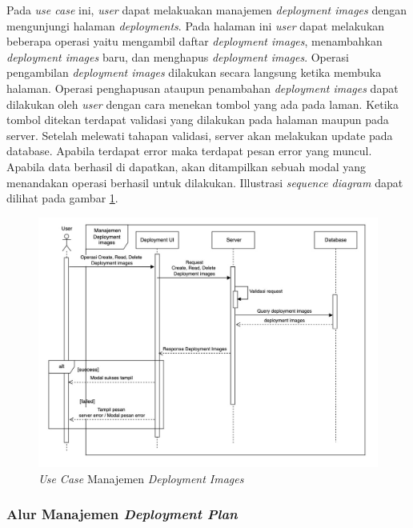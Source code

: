 Pada \textit{use case} ini, \textit{user} dapat melakuakan manajemen \textit{deployment images} dengan mengunjungi halaman \textit{deployments}. Pada halaman ini \textit{user} dapat melakukan beberapa operasi yaitu mengambil daftar \textit{deployment images}, menambahkan \textit{deployment images} baru, dan menghapus \textit{deployment images}. Operasi pengambilan \textit{deployment images} dilakukan secara langsung ketika membuka halaman. Operasi penghapusan ataupun penambahan \textit{deployment images} dapat dilakukan oleh \textit{user} dengan cara menekan tombol yang ada pada laman. Ketika tombol ditekan terdapat validasi yang dilakukan pada halaman maupun pada server. Setelah melewati tahapan validasi, server akan melakukan update pada database. Apabila terdapat error maka terdapat pesan error yang muncul. Apabila data berhasil di dapatkan, akan ditampilkan sebuah modal yang menandakan operasi berhasil untuk dilakukan. Illustrasi \textit{sequence diagram} dapat dilihat pada gambar \ref{fig:usecase-10}.

\begin{figure}[ht]
  \centering
  \includegraphics[width=1\textwidth]{resources/chapter-3/usecase/uc-10.jpg}
  \caption{\textit{Use Case} Manajemen \textit{Deployment Images}}
  \label{fig:usecase-10}
\end{figure}

\pagebreak

\subsubsection{Alur Manajemen \textit{Deployment Plan}}

